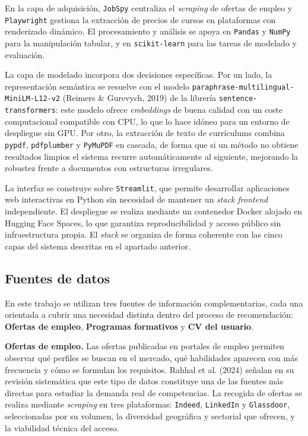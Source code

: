En la capa de adquisición, \texttt{JobSpy} centraliza el \textit{scraping} de ofertas de empleo y \texttt{Playwright} gestiona la extracción de precios de cursos en plataformas con renderizado dinámico. El procesamiento y análisis se apoya en \texttt{Pandas} y \texttt{NumPy} para la manipulación tabular, y en \texttt{scikit-learn} para las tareas de modelado y evaluación.

La capa de modelado incorpora dos decisiones específicas. Por un lado, la representación semántica se resuelve con el modelo \texttt{paraphrase-multilingual-MiniLM-L12-v2} (Reimers \& Gurevych, 2019) de la librería \texttt{sentence-transformers}: este modelo ofrece \textit{embeddings} de buena calidad con un coste computacional compatible con CPU, lo que lo hace idóneo para un entorno de despliegue sin GPU. Por otro, la extracción de texto de currículums combina \texttt{pypdf}, \texttt{pdfplumber} y \texttt{PyMuPDF} en cascada, de forma que si un método no obtiene resultados limpios el sistema recurre automáticamente al siguiente, mejorando la robustez frente a documentos con estructuras irregulares.

La interfaz se construye sobre \texttt{Streamlit}, que permite desarrollar aplicaciones web interactivas en Python sin necesidad de mantener un \textit{stack frontend} independiente. El despliegue se realiza mediante un contenedor Docker alojado en Hugging Face Spaces, lo que garantiza reproducibilidad y acceso público sin infraestructura propia. El \textit{stack} se organiza de forma coherente con las cinco capas del sistema descritas en el apartado anterior.

\subsection{Fuentes de datos}
\label{subsec:fuentes_de_datos}
En este trabajo se utilizan tres fuentes de información complementarias, cada una orientada a cubrir una necesidad distinta dentro del proceso de recomendación: \textbf{Ofertas de empleo}, \textbf{Programas formativos} y \textbf{CV del usuario}.

\textbf{Ofertas de empleo.} Las ofertas publicadas en portales de empleo permiten observar qué perfiles se buscan en el mercado, qué habilidades aparecen con más frecuencia y cómo se formulan los requisitos. Rahhal et al. (2024) señalan en su revisión sistemática que este tipo de datos constituye una de las fuentes más directas para estudiar la demanda real de competencias. La recogida de ofertas se realiza mediante \textit{scraping} en tres plataformas: \texttt{Indeed}, \texttt{LinkedIn} y \texttt{Glassdoor}, seleccionadas por su volumen, la diversidad geográfica y sectorial que ofrecen, y la viabilidad técnica del acceso.

